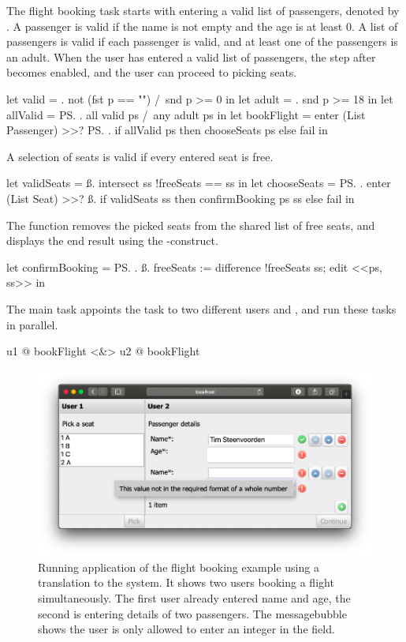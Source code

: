 The flight booking task starts with entering a valid list of passengers,
denoted by .
A passenger is valid if the name is not empty and the age is at least 0.
A list of passengers is valid if each passenger is valid, and at least one of the passengers is an adult.
When the user has entered a valid list of passengers, the step after  becomes enabled,
and the user can proceed to picking seats.
\begin{TASK}
  let valid = \p. not (fst p == "") /\ snd p >= 0 in
  let adult = \p. snd p >= 18 in
  let allValid = \ps. all valid ps /\ any adult ps in
  let bookFlight = enter (List Passenger) >>? \ps.
    if allValid ps then chooseSeats ps else fail in
\end{TASK}
A selection of seats is valid if every entered seat is free.
\begin{TASK}
  let validSeats = \ss. intersect ss !freeSeats == ss in
  let chooseSeats = \ps. enter (List Seat) >>? \ss.
    if validSeats ss then confirmBooking ps ss else fail in
\end{TASK}
The function  removes the picked seats from the shared list of free seats,
and displays the end result using the -construct.
\begin{TASK}
  let confirmBooking = \ps. \ss.
    freeSeats := difference !freeSeats ss; edit <<ps, ss>> in
\end{TASK}

The main task appoints the  task to two different users  and ,
and run these tasks in parallel.
\begin{TASK}
  u1 @ bookFlight <&> u2 @ bookFlight
\end{TASK}

\begin{figure}[h]
  \includegraphics[width=\columnwidth]{figures/flight-booking.png}
  \caption{
    Running application of the flight booking example using a translation to the \ITASKS system.
    It shows two users booking a flight simultaneously.
    The first user already entered name and age,
    the second is entering details of two passengers.
    The messagebubble shows the user is only allowed to enter an integer in the  field.
  }
  \label{fig:flight-booking}
\end{figure}
